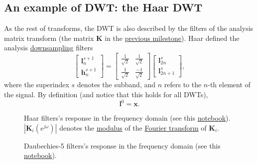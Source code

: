 \subsection{An example of DWT: the Haar DWT}
As the rest of transforms, the DWT is also described by the filters of
the analysis matrix transform (the matrix ${\mathbf K}$ in the
\href{https://sistemas-multimedia.github.io/study_guide/06-color_transform/}{previous
  milestone}). Haar defined the analysis
\href{https://en.wikipedia.org/wiki/Downsampling_(signal_processing)}{downsampling}
filters
\begin{equation}
  \begin{bmatrix}
    {\mathbf l}^{s+1}_n \\
    {\mathbf h}^{s+1}_n
  \end{bmatrix}
  = 
  \begin{bmatrix} \frac{1}{\sqrt{2}} & \frac{1}{\sqrt{2}} \\ \frac{1}{\sqrt{2}} & \frac{-1}{\sqrt{2}} \end{bmatrix}
  \begin{bmatrix}
    {\mathbf l}^s_{2n} \\
    {\mathbf l}^s_{2n+1}
  \end{bmatrix},
  \label{eq:Haar_transform}
\end{equation}
where the superindex $s$ denotes the subband, and $n$ refers to the
$n$-th element of the signal. By definition (and notice that this
holds for all DWTs),
\begin{equation}
  {\mathbf l}^0={\mathbf x}.
\end{equation}

\begin{figure}
  \centering
  \caption{Haar filters's response in the frequency domain (see this
    \href{https://github.com/Sistemas-Multimedia/Sistemas-Multimedia.github.io/blob/master/study_guide/05-DWT/dwt_filters_analysis.ipynb}{notebook}).
    $|{\mathbf K}_i(e^{j\omega})|$ denotes the
    \href{https://en.wikipedia.org/wiki/Absolute_value}{modulus} of
    the \href{https://en.wikipedia.org/wiki/Fourier_transform}{Fourier
      transform} of ${\mathbf K}_i$.}
  \label{fig:Haar_modulus}
\end{figure}

\begin{figure}
  \centering
  \caption{Daubechies-5 filters's response in the frequency domain
    (see this
    \href{https://github.com/Sistemas-Multimedia/Sistemas-Multimedia.github.io/blob/master/study_guide/05-DWT/dwt_filters_analysis.ipynb}{notebook}).}
  \label{fig:db5_modulus}
\end{figure}

